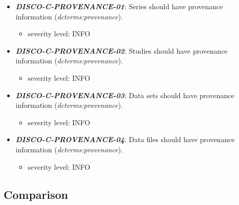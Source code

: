 \documentclass{llncs}
\begin{document}
\begin{itemize}
	\item \textbf{{\em DISCO-C-PROVENANCE-01}}: 
	Series should have provenance information (\emph{dcterms:provenance}).
	\begin{itemize}
		\item severity level: INFO
	\end{itemize}
	\item \textbf{{\em DISCO-C-PROVENANCE-02}}: 
	Studies should have provenance information (\emph{dcterms:provenance}).
	\begin{itemize}
		\item severity level: INFO
	\end{itemize}
	\item \textbf{{\em DISCO-C-PROVENANCE-03}}: 
	Data sets should have provenance information (\emph{dcterms:provenance}).
	\begin{itemize}
		\item severity level: INFO
	\end{itemize}
	\item \textbf{{\em DISCO-C-PROVENANCE-04}}: 
	Data files should have provenance information (\emph{dcterms:provenance}).
	\begin{itemize}
		\item severity level: INFO
	\end{itemize}
\end{itemize} 
 
\subsection{Comparison}
\setcounter{subsection}{76}
\end{document}
